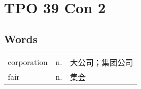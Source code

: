 \section{TPO 39 Con 2}

\subsection{Words}

\begin{tabular}{lll}
    corporation & n. & 大公司；集团公司 \\
    fair        & n. & 集会       \\
\end{tabular}
